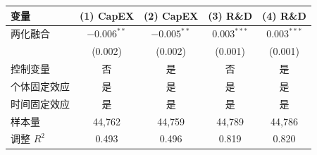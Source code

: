 {\scriptsize
\begin{center}
\begin{tabular}{lcccc}
  \toprule
  变量 & (1) CapEX & (2) CapEX & (3) R\&D & (4) R\&D \\
  \midrule
  两化融合 & $-0.006^{**}$ & $-0.005^{**}$ & $0.003^{***}$ & $0.003^{***}$ \\
             & (0.002) & (0.002) & (0.001) & (0.001) \\
  控制变量 & 否 & 是 & 否 & 是 \\
  个体固定效应 & 是 & 是 & 是 & 是 \\
  时间固定效应 & 是 & 是 & 是 & 是 \\
  样本量 & 44,762 & 44,759 & 44,789 & 44,786 \\
  调整 $R^2$ & 0.493 & 0.496 & 0.819 & 0.820 \\
  \bottomrule
\end{tabular}
\end{center}
}
